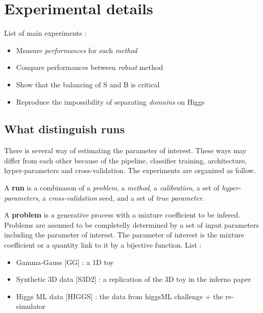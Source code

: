 \ifpdf
    \graphicspath{{Appendix1/Figs/Raster/}{Appendix1/Figs/PDF/}{Appendix1/Figs/}}
\else
    \graphicspath{{Appendix1/Figs/Vector/}{Appendix1/Figs/}}
\fi

\chapter{Experimental details} 

List of main experiments : 
\begin{itemize}
	\item Measure \emph{performances} for each \emph{method}
	\item Compare performances between \emph{robust} method
	\item Show that the balancing of S and B is critical
	\item Reproduce the impossibility of separating \emph{domains} on Higgs
\end{itemize}



\section{What distinguish runs} %
\label{sec:what_distinguish_runs}

There is several way of estimating the parameter of interest.
These ways may differ from each other because of the pipeline, classifier training, architecture, hyper-parameters and cross-validation.
The experiments are organized as follow.

A \textbf{run} is a combinason of a \emph{problem}, a \emph{method}, a \emph{calibration}, a set of \emph{hyper-parameters}, a \emph{cross-validation} seed, and a set of \emph{true parameter}.

A \textbf{problem} is a generative process with a mixture coefficient to be infered.
Problems are assumed to be completelly determined by a set of input parameters including the parameter of interest.
The parameter of interest is the mixture coefficient or a quantity link to it by a bijective function.
List :
\begin{itemize}
	\item Gamma-Gauss [GG] : a 1D toy
	\item Synthetic 3D data [S3D2] : a replication of the 3D toy in the inferno paper
	\item Higgs ML data [HIGGS] : the data from higgsML challenge + the re-simulator
\end{itemize}

